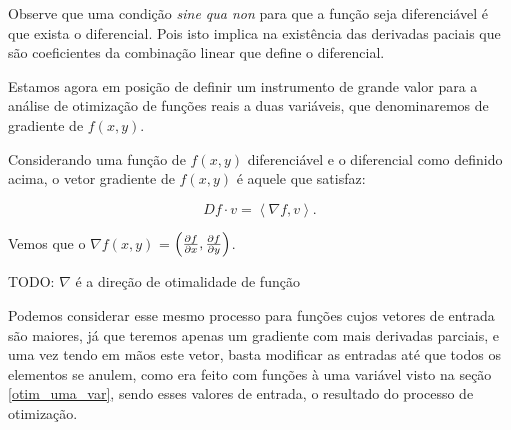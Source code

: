 Observe que uma condição \textit{sine qua non} para que a função seja
diferenciável é que exista o diferencial. Pois isto implica na existência das
derivadas paciais que são coeficientes da combinação linear que define o
diferencial.

Estamos agora em posição de definir um instrumento de grande valor para a
análise de otimização de funções reais a duas variáveis, que denominaremos de
gradiente de $f(x, y)$.

\begin{definition}[Gradiente de $f(x, y)$]

    Considerando uma função de $f(x, y)$ diferenciável e o diferencial como
    definido acima, o vetor gradiente de $f(x, y)$ é aquele que satisfaz:

    \begin{equation}
        Df \cdot v = \left\langle \nabla f, v \right\rangle.
    \end{equation}

    Vemos que o $\nabla f(x, y)$ = $\left(\frac{\partial f}{\partial x}, \frac{\partial f}{\partial y}\right)$.


\end{definition}

    \begin{proposition}
        TODO: $\nabla$ é a direção de otimalidade de função
    \end{proposition}


Podemos considerar esse mesmo processo para funções cujos vetores de entrada são
maiores, já que teremos apenas um gradiente com mais derivadas parciais, e uma
vez tendo em mãos este vetor, basta modificar as entradas até que todos os
elementos se anulem, como era feito com funções à uma variável visto na
seção \ref{otim_uma_var}, sendo esses valores de entrada, o resultado do
processo de otimização.




%
